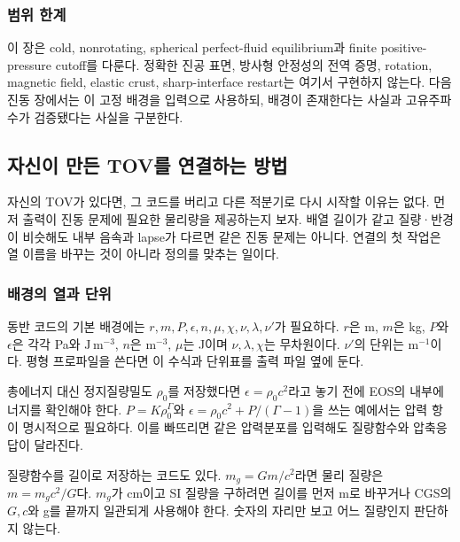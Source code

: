 \documentclass[
  10pt,
  a4paper,
]{article}
\begin{document}
\subsubsection{범위 한계}\label{uxbc94uxc704-uxd55cuxacc4}

이 장은 cold, nonrotating, spherical perfect-fluid equilibrium과 finite
positive-pressure cutoff를 다룬다. 정확한 진공 표면, 방사형 안정성의
전역 증명, rotation, magnetic field, elastic crust, sharp-interface
restart는 여기서 구현하지 않는다. 다음 진동 장에서는 이 고정 배경을
입력으로 사용하되, 배경이 존재한다는 사실과 고유주파수가 검증됐다는
사실을 구분한다.

\subsection{자신이 만든 TOV를 연결하는
방법}\label{uxc790uxc2e0uxc774-uxb9ccuxb4e0-tovuxb97c-uxc5f0uxacb0uxd558uxb294-uxbc29uxbc95}

자신의 TOV가 있다면, 그 코드를 버리고 다른 적분기로 다시 시작할 이유는
없다. 먼저 출력이 진동 문제에 필요한 물리량을 제공하는지 보자. 배열
길이가 같고 질량·반경이 비슷해도 내부 음속과 lapse가 다르면 같은 진동
문제는 아니다. 연결의 첫 작업은 열 이름을 바꾸는 것이 아니라 정의를
맞추는 일이다.

\subsubsection{배경의 열과
단위}\label{uxbc30uxacbduxc758-uxc5f4uxacfc-uxb2e8uxc704}

동반 코드의 기본 배경에는
\(r,m,P,\epsilon,n,\mu,\chi,\nu,\lambda,\nu'\)가 필요하다. \(r\)은 m,
\(m\)은 kg, \(P\)와 \(\epsilon\)은 각각 Pa와 \(\mathrm{J\,m^{-3}}\),
\(n\)은 \(\mathrm{m^{-3}}\), \(\mu\)는 J이며 \(\nu,\lambda,\chi\)는
무차원이다. \(\nu'\)의 단위는 \(\mathrm{m^{-1}}\)이다. 평형 프로파일을
쓴다면 이 수식과 단위표를 출력 파일 옆에 둔다.

총에너지 대신 정지질량밀도 \(\rho_0\)를 저장했다면
\(\epsilon=\rho_0c^2\)라고 놓기 전에 EOS의 내부에너지를 확인해야 한다.
\(P=K\rho_0^\Gamma\)와 \(\epsilon=\rho_0c^2+P/(\Gamma-1)\)을 쓰는
예에서는 압력 항이 명시적으로 필요하다. 이를 빠뜨리면 같은 압력분포를
입력해도 질량함수와 압축응답이 달라진다.

질량함수를 길이로 저장하는 코드도 있다. \(m_g=Gm/c^2\)라면 물리 질량은
\(m=m_gc^2/G\)다. \(m_g\)가 cm이고 SI 질량을 구하려면 길이를 먼저 m로
바꾸거나 CGS의 \(G,c\)와 g를 끝까지 일관되게 사용해야 한다. 숫자의
자리만 보고 어느 질량인지 판단하지 않는다.
\end{document}
